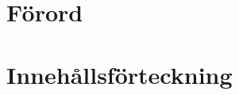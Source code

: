 







\chapter{Förord}



\newpage

\chapter{Innehållsförteckning}
\makeatletter
{}
\makeatother

\newpage











